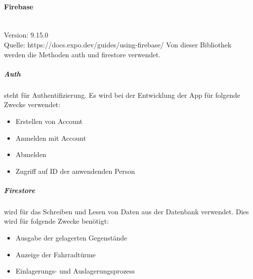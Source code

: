 \paragraph{Firebase}\mbox{}\\
Version: 9.15.0\\
Quelle: https://docs.expo.dev/guides/using-firebase/
\bigskip
Von dieser Bibliothek werden die Methoden auth und firestore verwendet.
\subparagraph{Auth}steht für Authentifizierung. Es wird bei der Entwicklung der App für folgende Zwecke verwendet:
\begin{itemize}
  \item Erstellen von Account
  \item Anmelden mit Account
  \item Abmelden
  \item Zugriff auf ID der anwendenden Person
\end{itemize}

\subparagraph{Firestore}wird für das Schreiben und Lesen von Daten aus der Datenbank verwendet. Dies wird für folgende Zwecke benötigt:
\begin{itemize}
  \item Ausgabe der gelagerten Gegenstände
  \item Anzeige der Fahrradtürme
  \item Einlagerungs- und Auslagerungsprozess
\end{itemize}

